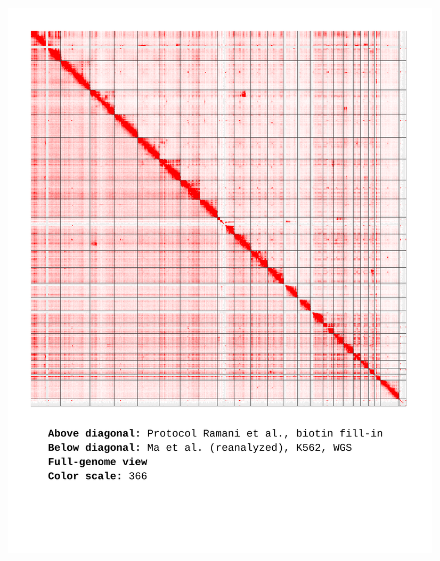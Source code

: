 \documentclass[a4paper,14pt]{extarticle}
\begin{document}
\begin{figure}[hp!] \includegraphics[width=1\textwidth]{ma-wgs_s30_ALL_366.pdf} \end{figure}
\end{document}
